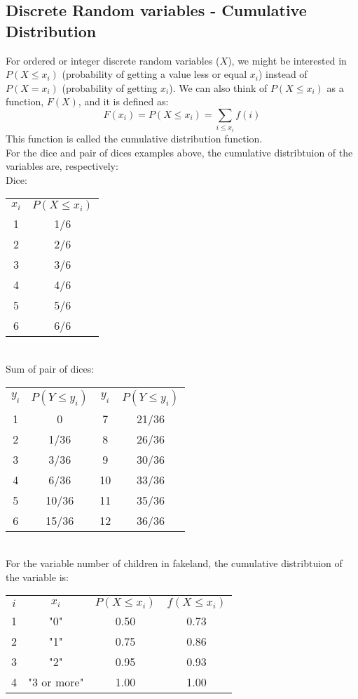 \documentclass[11pt]{article}
\begin{document}
	\subsection*{Discrete Random variables - Cumulative Distribution}
	For ordered or integer discrete random variables ($X$), we might be interested in $P(X \leq x_i)$ (probability of getting a value less or equal $x_i$) instead of $P(X=x_i)$ (probability of getting $x_i$). We can also think of $P(X \leq x_i)$ as a function, $F(X)$, and it is defined as:
	\[F(x_i) = P(X \leq x_i) =  \sum\limits_{i\leq x_i} f(i)\]
	This function is called the cumulative distribution function.\\
	
	For the dice and pair of dices examples above, the cumulative distribtuion of the variables are, respectively:\\

	Dice:

	\begin{tabular}{|c|c|}
\hline
	$x_i$ & $P(X \leq x_i)$\\
	\cline{1-2}
	1 & 1/6\\
	2 & 2/6\\
	3 & 3/6\\
	4 & 4/6\\
	5 & 5/6\\
	6 & 6/6\\

\hline
\end{tabular}\newline\\

	Sum of pair of dices:

	\begin{tabular}{|c|c|c|c|}
\hline
	$y_i$ & $P(Y \leq  y_i)$ & $y_i$ & $P(Y \leq y_i)$\\
	\cline{1-4}
	1 & 0 & 7 & 21/36\\
	2 & 1/36 & 8 & 26/36\\
	3 & 3/36 & 9 & 30/36\\
	4 & 6/36 & 10 & 33/36\\
	5 & 10/36 & 11 & 35/36\\
	6 & 15/36 & 12 & 36/36\\
\hline
\end{tabular}\newline\\

	For the variable number of children in fakeland, the cumulative distribtuion of the variable is:\\

\begin{tabular}{|c|c|c|c|}
\hline
	$i$ & $x_i$ & $P(X \leq x_i)$ & $f(X \leq x_i)$\\
	\cline{1-4}
	1 & "0" & 0.50 & 0.73\\
	2 & "1" & 0.75 & 0.86\\
	3 & "2" & 0.95 & 0.93\\
	4 & "3 or more" & 1.00 & 1.00\\	
\hline
\end{tabular}\newline\\
\end{document}
